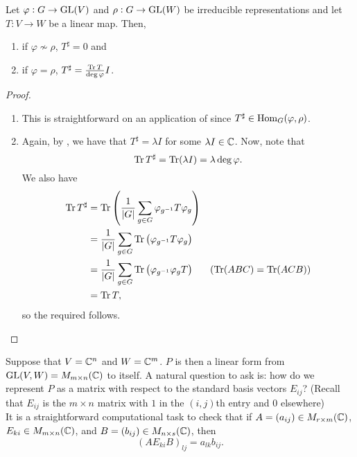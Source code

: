 		\begin{fprop}
			\label{prop: schur lemma but sharp}
			Let $\varphi : G \to \operatorname{GL}(V)$ and $\rho : G \to \operatorname{GL}(W)$ be irreducible representations and let $T : V \to W$ be a linear map. Then,
			\begin{enumerate}[label=(\alph*)]
				\item if $\varphi \not\sim \rho$, $T^\sharp = 0$ and
				\item if $\varphi = \rho$, $T^\sharp = \frac{\operatorname{Tr} T}{\deg \varphi} I$.
			\end{enumerate}
		\end{fprop}
		\begin{proof}
			\phantom{pain}
			\begin{enumerate}[label = (\alph*)]
				\item This is straightforward on an application of  since $T^\sharp \in \operatorname{Hom}_G(\varphi,\rho)$.
				\item Again, by , we have that $T^\sharp = \lambda I$ for some $\lambda I \in \mathbb{C}$. Now, note that
				\[ \operatorname{Tr} T^\sharp = \operatorname{Tr}(\lambda I) = \lambda \deg \varphi. \]
				We also have
				\begin{align*}
					\operatorname{Tr} T^\sharp &= \operatorname{Tr} \left( \frac{1}{|G|} \sum_{g \in G} \varphi_{g^{-1}} T \varphi_g \right) \\
						&= \frac{1}{|G|} \sum_{g \in G} \operatorname{Tr} \left( \varphi_{g^{-1}} T \varphi_g \right) \\
						&= \frac{1}{|G|} \sum_{g \in G} \operatorname{Tr} \left( \varphi_{g^{-1}} \varphi_g T \right) & (\operatorname{Tr}(ABC) = \operatorname{Tr}(ACB)) \\
						&= \operatorname{Tr} T,
				\end{align*}
				so the required follows.
			\end{enumerate}
		\end{proof}

		Suppose that $V = \mathbb{C}^n$ and $W = \mathbb{C}^m$. $P$ is then a linear form from $\operatorname{GL}(V,W) = M_{m \times n}(\mathbb{C})$ to itself. A natural question to ask is: how do we represent $P$ as a matrix with respect to the standard basis vectors $E_{ij}$? (Recall that $E_{ij}$ is the $m \times n$ matrix with $1$ in the $(i,j)$th entry and $0$ elsewhere)\\
		It is a straightforward computational task to check that if $A = (a_{ij}) \in M_{r \times m}(\mathbb{C})$, $E_{ki} \in M_{m \times n}(\mathbb{C})$, and $B = (b_{ij}) \in M_{n \times s}(\mathbb{C})$, then
		\begin{equation}
			(AE_{ki}B)_{lj} = a_{lk} b_{ij}.
		\end{equation}

